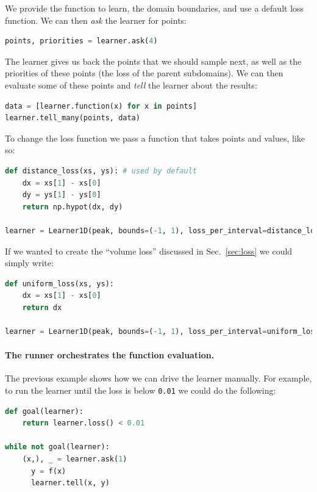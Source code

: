 \documentclass[english, twocolumn, 10pt, aps, superscriptaddress, floatfix, prb, citeautoscript]{revtex4-1}
\newcommand{\passthrough}[1]{\lstset{mathescape=false}#1\lstset{mathescape=true}}
\begin{document}
We provide the function to learn, the domain boundaries, and use a default loss function.
We can then \emph{ask} the learner for points:

\begin{lstlisting}[language=Python]
points, priorities = learner.ask(4)
\end{lstlisting}

The learner gives us back the points that we should sample next, as well as the priorities of these points (the loss of the parent subdomains).
We can then evaluate some of these points and \emph{tell} the learner about the results:

\begin{lstlisting}[language=Python]
data = [learner.function(x) for x in points]
learner.tell_many(points, data)
\end{lstlisting}

To change the loss function we pass a function that takes points and values, like so:

\begin{lstlisting}[language=Python]
def distance_loss(xs, ys): # used by default
    dx = xs[1] - xs[0]
    dy = ys[1] - ys[0]
    return np.hypot(dx, dy)

learner = Learner1D(peak, bounds=(-1, 1), loss_per_interval=distance_loss)
\end{lstlisting}

If we wanted to create the ``volume loss'' discussed in Sec.~\ref{sec:loss} we could simply write:

\begin{lstlisting}[language=Python]
def uniform_loss(xs, ys):
    dx = xs[1] - xs[0]
    return dx

learner = Learner1D(peak, bounds=(-1, 1), loss_per_interval=uniform_loss)
\end{lstlisting}

\paragraph{The runner orchestrates the function evaluation.}

The previous example shows how we can drive the learner manually.
For example, to run the learner until the loss is below \passthrough{\lstinline!0.01!} we could do the following:

\begin{lstlisting}[language=Python]
def goal(learner):
    return learner.loss() < 0.01

while not goal(learner):
    (x,), _ = learner.ask(1)
      y = f(x)
      learner.tell(x, y)
\end{lstlisting}
\end{document}
